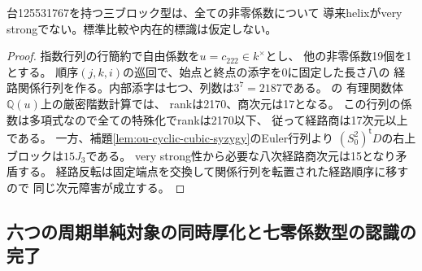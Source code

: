 \begin{theorem}
\label{thm:ou-seven-zero-eighth-path-exclusion}
台125531767を持つ三ブロック型は、全ての非零係数について
導来helixがvery strongでない。標準比較や内在的標識は仮定しない。
\end{theorem}
\begin{proof}
指数行列の行簡約で自由係数を$u=c_{222}\in k^\times$とし、
他の非零係数19個を1とする。
順序$(j,k,i)$の巡回で、始点と終点の添字を0に固定した長さ八の
経路関係行列を作る。内部添字は七つ、列数は$3^7=2187$である。
の
有理関数体$\mathbb Q(u)$上の厳密階数計算では、
rankは2170、商次元は17となる。
この行列の係数は多項式なので全ての特殊化でrankは2170以下、
従って経路商は17次元以上である。
一方、補題\ref{lem:ou-cyclic-cubic-syzygy}のEuler行列より
$(S_0^2)^{\mathsf t}D$の右上ブロックは$15J_3$である。
very strong性から必要な八次経路商次元は15となり矛盾する。
経路反転は固定端点を交換して関係行列を転置された経路順序に移すので
同じ次元障害が成立する。
\end{proof}

\subsection{六つの周期単純対象の同時厚化と七零係数型の認識の完了}
\label{subsec:ou-seven-zero-six-cycle}

